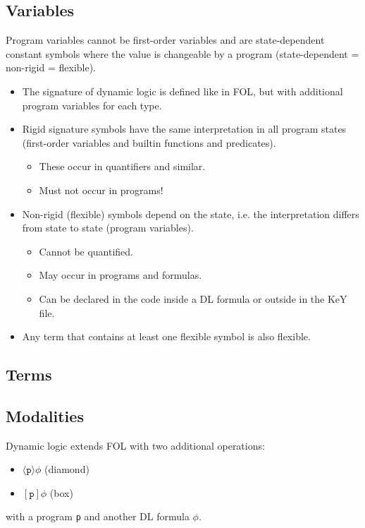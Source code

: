 		\subsection{Variables}
			Program variables cannot be first-order variables and are state-dependent constant symbols where the value is changeable by a program (state-dependent = non-rigid = flexible).
			
			\begin{itemize}
				\item The signature of dynamic logic is defined like in FOL, but with additional program variables for each type.
				\item Rigid signature symbols have the same interpretation in all program states (first-order variables and builtin functions and predicates).
					\begin{itemize}
						\item These occur in quantifiers and similar.
						\item Must not occur in programs!
					\end{itemize}
				\item Non-rigid (flexible) symbols depend on the state, i.e. the interpretation differs from state to state (program variables).
					\begin{itemize}
						\item Cannot be quantified.
						\item May occur in programs and formulas.
						\item Can be declared in the code inside a DL formula or outside in the KeY file.
					\end{itemize}
				\item Any term that contains at least one flexible symbol is also flexible.
			\end{itemize}

		\subsection{Terms}

		\subsection{Modalities}
			Dynamic logic extends FOL with two additional operations:
			\begin{itemize}
				\item \( \langle \texttt{p} \rangle \phi \) (diamond)
				\item \( [\texttt{p}] \phi \) (box)
			\end{itemize}
			with a program \texttt{p} and another DL formula \(\phi\).
			
